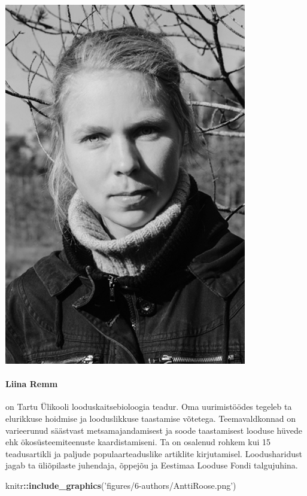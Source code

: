 \documentclass[estonian,]{article}
\newenvironment{Shaded}{\begin{snugshade}}{\end{snugshade}}
\newcommand{\KeywordTok}[1]{\textcolor[rgb]{0.13,0.29,0.53}{\textbf{#1}}}
\newcommand{\NormalTok}[1]{#1}
\newcommand{\OperatorTok}[1]{\textcolor[rgb]{0.81,0.36,0.00}{\textbf{#1}}}
\newcommand{\StringTok}[1]{\textcolor[rgb]{0.31,0.60,0.02}{#1}}
\let\oldparagraph\paragraph
\renewcommand{\paragraph}[1]{\oldparagraph{#1}\mbox{}}
\begin{document}
\begin{flushleft}\includegraphics[width=0.5\linewidth]{figures/6-authors/LiinaRemm} \end{flushleft}

\hypertarget{liina-remm}{%
\paragraph{Liina Remm}\label{liina-remm}}

on Tartu Ülikooli looduskaitsebioloogia teadur. Oma uurimistöödes tegeleb ta elurikkuse hoidmise ja looduslikkuse taastamise võtetega. Teemavaldkonnad on varieerunud säästvast metsamajandamisest ja soode taastamisest looduse hüvede ehk ökosüsteemiteenuste kaardistamiseni. Ta on osalenud rohkem kui 15 teadusartikli ja paljude populaarteaduslike artiklite kirjutamisel. Loodusharidust jagab ta üliõpilaste juhendaja, õppejõu ja Eestimaa Looduse Fondi talgujuhina.

\begin{Shaded}
\begin{Highlighting}[]
\NormalTok{knitr}\OperatorTok{::}\KeywordTok{include_graphics}\NormalTok{(}\StringTok{'figures/6-authors/AnttiRoose.png'}\NormalTok{)}
\end{Highlighting}
\end{Shaded}
\end{document}
